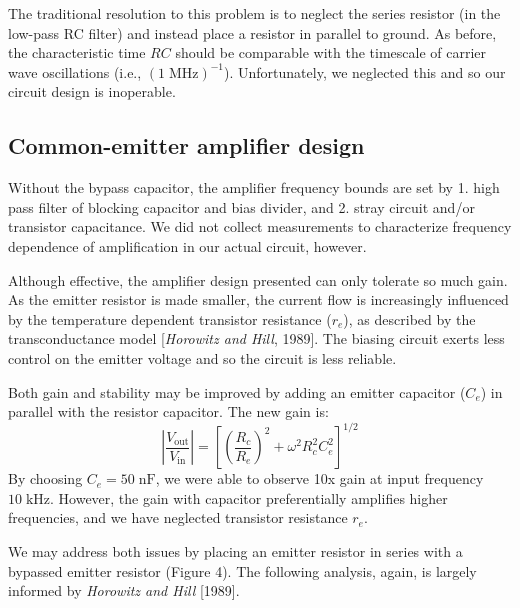 \documentclass[11pt]{article}
\newcommand {\mt}{\mathrm}
\newcommand {\unit}[1]{\; \mt{#1}}
\begin{document}
The traditional resolution to this problem is to neglect the series resistor
(in the low-pass RC filter) and instead place a resistor in parallel to ground.
As before, the characteristic time $RC$ should be comparable with the timescale
of carrier wave oscillations (i.e., $(1 \unit{MHz})^{-1}$).  Unfortunately, we
neglected this and so our circuit design is inoperable.

\subsection{Common-emitter amplifier design}

Without the bypass capacitor, the amplifier frequency bounds are set by 1. high
pass filter of blocking capacitor and bias divider, and 2. stray circuit and/or
transistor capacitance.  We did not collect measurements to characterize
frequency dependence of amplification in our actual circuit, however.

Although effective, the amplifier design presented can only tolerate so much
gain.  As the emitter resistor is made smaller, the current flow is
increasingly influenced by the temperature dependent transistor resistance
($r_e$), as described by the transconductance model [\textit{Horowitz and
Hill}, 1989]. The biasing circuit exerts less control on the emitter voltage
and so the circuit is less reliable.

Both gain and stability may be improved by adding an emitter capacitor ($C_e$)
in parallel with the resistor capacitor.  The new gain is:
\[
  \left| \frac{V_\mt{out}}{V_\mt{in}} \right|
    = \left[ \left(\frac{R_c}{R_e}\right)^2
      + \omega^2 R_c^2 C_e^2 \right]^{1/2}
\]
By choosing $C_e = 50 \unit{nF}$, we were able to observe 10x gain at input
frequency $10 \unit{kHz}$.  However, the gain with capacitor preferentially
amplifies higher frequencies, and we have neglected transistor resistance
$r_e$.

We may address both issues by placing an emitter resistor in series with a
bypassed emitter resistor (Figure 4).  The following analysis, again, is
largely informed by \textit{Horowitz and Hill} [1989].
\end{document}

